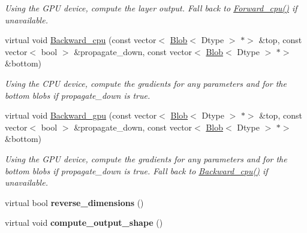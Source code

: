 \begin{DoxyCompactItemize}
\begin{DoxyCompactList}\small\item\em Using the G\+PU device, compute the layer output. Fall back to \mbox{\hyperlink{classcaffe_1_1_convolution_layer_aee44e1abace0f8827db48632b62efc22}{Forward\+\_\+cpu()}} if unavailable. \end{DoxyCompactList}\item 
\mbox{\label{classcaffe_1_1_convolution_layer_abc5856be2ccd0435f245ca7cbd5c00ef}} 
virtual void \mbox{\hyperlink{classcaffe_1_1_convolution_layer_abc5856be2ccd0435f245ca7cbd5c00ef}{Backward\+\_\+cpu}} (const vector$<$ \mbox{\hyperlink{classcaffe_1_1_blob}{Blob}}$<$ Dtype $>$ $\ast$$>$ \&top, const vector$<$ bool $>$ \&propagate\+\_\+down, const vector$<$ \mbox{\hyperlink{classcaffe_1_1_blob}{Blob}}$<$ Dtype $>$ $\ast$$>$ \&bottom)
\begin{DoxyCompactList}\small\item\em Using the C\+PU device, compute the gradients for any parameters and for the bottom blobs if propagate\+\_\+down is true. \end{DoxyCompactList}\item 
\mbox{\label{classcaffe_1_1_convolution_layer_a2584d7e32e5bb3a9f959aed8e5086575}} 
virtual void \mbox{\hyperlink{classcaffe_1_1_convolution_layer_a2584d7e32e5bb3a9f959aed8e5086575}{Backward\+\_\+gpu}} (const vector$<$ \mbox{\hyperlink{classcaffe_1_1_blob}{Blob}}$<$ Dtype $>$ $\ast$$>$ \&top, const vector$<$ bool $>$ \&propagate\+\_\+down, const vector$<$ \mbox{\hyperlink{classcaffe_1_1_blob}{Blob}}$<$ Dtype $>$ $\ast$$>$ \&bottom)
\begin{DoxyCompactList}\small\item\em Using the G\+PU device, compute the gradients for any parameters and for the bottom blobs if propagate\+\_\+down is true. Fall back to \mbox{\hyperlink{classcaffe_1_1_convolution_layer_a11279ea7bea3843a776a766b93e27e50}{Backward\+\_\+cpu()}} if unavailable. \end{DoxyCompactList}\item 
\mbox{\label{classcaffe_1_1_convolution_layer_aad2f350240e3e97220230d7b4ceb9bf7}} 
virtual bool {\bfseries reverse\+\_\+dimensions} ()
\item 
\mbox{\label{classcaffe_1_1_convolution_layer_ae9dc86f7b0136b80751afff7446076d5}} 
virtual void {\bfseries compute\+\_\+output\+\_\+shape} ()
\end{DoxyCompactItemize}
